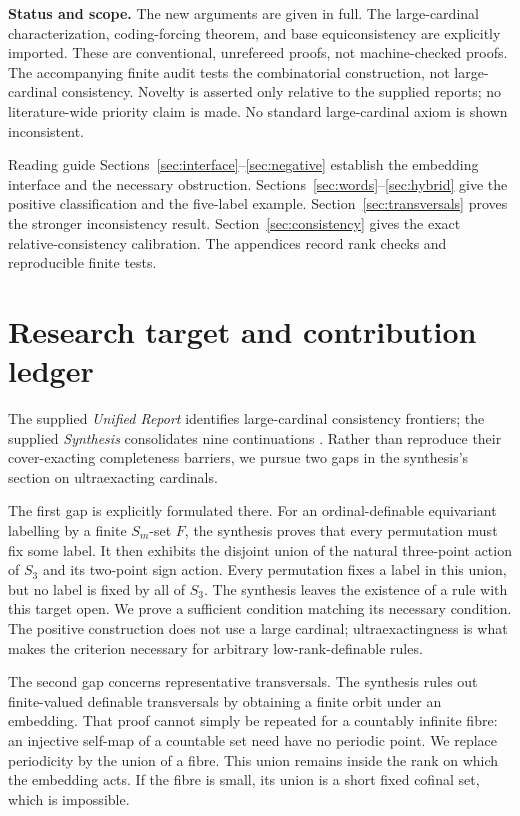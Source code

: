 \documentclass[11pt,letterpaper]{article}
\theoremstyle{definition}
\numberwithin{equation}{section}
\begin{document}
\textbf{Status and scope.} The new arguments are given in full. The large-cardinal characterization, coding-forcing theorem, and base equiconsistency are explicitly imported. These are conventional, unrefereed proofs, not machine-checked proofs. The accompanying finite audit tests the combinatorial construction, not large-cardinal consistency. Novelty is asserted only relative to the supplied reports; no literature-wide priority claim is made. No standard large-cardinal axiom is shown inconsistent.

\newpage
\tableofcontents
\vspace{8pt}
\begin{assessment}{Reading guide}
Sections~\ref{sec:interface}--\ref{sec:negative} establish the embedding interface and the necessary obstruction. Sections~\ref{sec:words}--\ref{sec:hybrid} give the positive classification and the five-label example. Section~\ref{sec:transversals} proves the stronger inconsistency result. Section~\ref{sec:consistency} gives the exact relative-consistency calibration. The appendices record rank checks and reproducible finite tests.
\end{assessment}

\section{Research target and contribution ledger}\label{sec:scope}

The supplied \emph{Unified Report} identifies large-cardinal consistency frontiers; the supplied \emph{Synthesis} consolidates nine continuations \cite{unified,synthesis}. Rather than reproduce their cover-exacting completeness barriers, we pursue two gaps in the synthesis's section on ultraexacting cardinals.

The first gap is explicitly formulated there. For an ordinal-definable equivariant labelling by a finite $S_m$-set $F$, the synthesis proves that every permutation must fix some label. It then exhibits the disjoint union of the natural three-point action of $S_3$ and its two-point sign action. Every permutation fixes a label in this union, but no label is fixed by all of $S_3$. The synthesis leaves the existence of a rule with this target open. We prove a sufficient condition matching its necessary condition. The positive construction does not use a large cardinal; ultraexactingness is what makes the criterion necessary for arbitrary low-rank-definable rules.

The second gap concerns representative transversals. The synthesis rules out finite-valued definable transversals by obtaining a finite orbit under an embedding. That proof cannot simply be repeated for a countably infinite fibre: an injective self-map of a countable set need have no periodic point. We replace periodicity by the union of a fibre. This union remains inside the rank on which the embedding acts. If the fibre is small, its union is a short fixed cofinal set, which is impossible.
\end{document}

